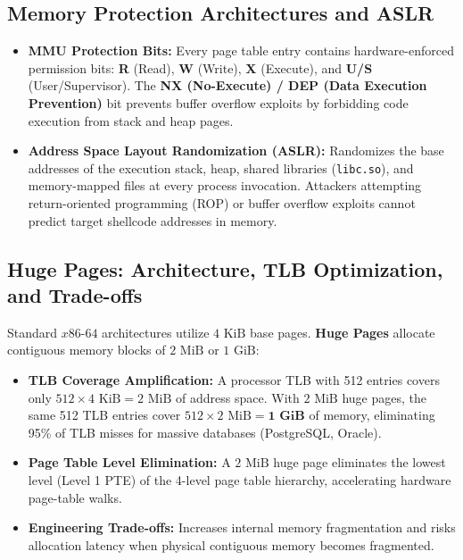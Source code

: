 \subsection{Memory Protection Architectures and ASLR}
\begin{itemize}
    \item \textbf{MMU Protection Bits:} Every page table entry contains hardware-enforced permission bits: \textbf{R} (Read), \textbf{W} (Write), \textbf{X} (Execute), and \textbf{U/S} (User/Supervisor). The \textbf{NX (No-Execute) / DEP (Data Execution Prevention)} bit prevents buffer overflow exploits by forbidding code execution from stack and heap pages.
    \item \textbf{Address Space Layout Randomization (ASLR):} Randomizes the base addresses of the execution stack, heap, shared libraries (\texttt{libc.so}), and memory-mapped files at every process invocation. Attackers attempting return-oriented programming (ROP) or buffer overflow exploits cannot predict target shellcode addresses in memory.
\end{itemize}

\subsection{Huge Pages: Architecture, TLB Optimization, and Trade-offs}
Standard $x86\text{-}64$ architectures utilize $4\text{ KiB}$ base pages. \textbf{Huge Pages} allocate contiguous memory blocks of $2\text{ MiB}$ or $1\text{ GiB}$:
\begin{itemize}
    \item \textbf{TLB Coverage Amplification:} A processor TLB with 512 entries covers only $512 \times 4\text{ KiB} = 2\text{ MiB}$ of address space. With $2\text{ MiB}$ huge pages, the same 512 TLB entries cover $512 \times 2\text{ MiB} = \mathbf{1\text{ GiB}}$ of memory, eliminating 95\% of TLB misses for massive databases (PostgreSQL, Oracle).
    \item \textbf{Page Table Level Elimination:} A $2\text{ MiB}$ huge page eliminates the lowest level (Level 1 PTE) of the 4-level page table hierarchy, accelerating hardware page-table walks.
    \item \textbf{Engineering Trade-offs:} Increases internal memory fragmentation and risks allocation latency when physical contiguous memory becomes fragmented.
\end{itemize}

